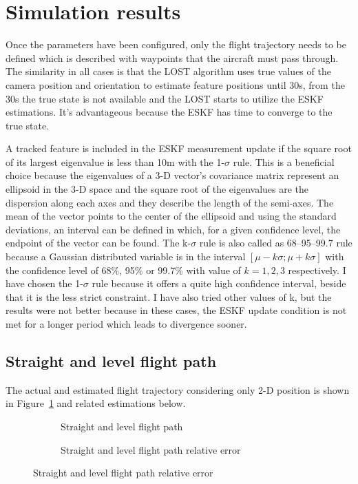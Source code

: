 \section{Simulation results}

Once the parameters have been configured, only the flight trajectory needs to be defined which is described with waypoints that the aircraft must pass through. The similarity in all cases is that the LOST algorithm uses true values of the camera position and orientation to estimate feature positions until 30\si{\second}, from the 30\si{\second} the true state is not available and the LOST starts to utilize the ESKF estimations. It's advantageous because the ESKF has time to converge to the true state.

A tracked feature is included in the ESKF measurement update if the square root of its largest eigenvalue is less than 10\si{\meter} with the 1-$\sigma$ rule. This is a beneficial choice because the eigenvalues of a 3-D vector's covariance matrix represent an ellipsoid in the 3-D space and the square root of the eigenvalues are the dispersion along each axes and they describe the length of the semi-axes. The mean of the vector points to the center of the ellipsoid and using the standard deviations, an interval can be defined in which, for a given confidence level, the endpoint of the vector can be found. The k-$\sigma$ rule is also called as 68--95--99.7 rule because a Gaussian distributed variable is in the interval $[\mu-k\sigma;\mu+k\sigma]$ with the confidence level of 68\%, 95\% or 99.7\% with value of $k=1, 2, 3$ respectively. I have chosen the 1-$\sigma$ rule because it offers a quite high confidence interval, beside that it is the less strict constraint. I have also tried other values of k, but the results were not better because in these cases, the ESKF update condition is not met for a longer period which leads to divergence sooner.

\subsection{Straight and level flight path}

The actual and estimated flight trajectory considering only 2-D position is shown in Figure~\ref{fig:straight-level} and related estimations below.

\begin{figure}[H]
    \centering
    \begin{subfigure}{0.45\textwidth}
        
        \caption{Straight and level flight path}\label{fig:straight-level}
    \end{subfigure}
    \begin{subfigure}{0.45\textwidth}
        
        \caption{Straight and level flight path relative error}\label{fig:straight-level-error}
    \end{subfigure}
\end{figure}

